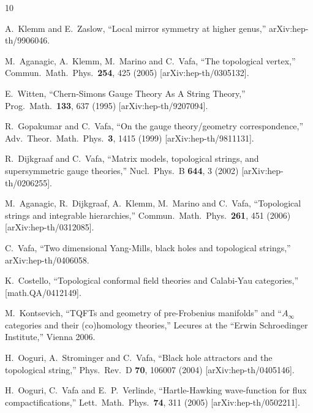 \documentclass[12pt]{article}
\begin{document}
\begin{thebibliography}{10}

  A.~Klemm and E.~Zaslow,
   ``Local mirror symmetry at higher genus,''
  arXiv:hep-th/9906046.


  M.~Aganagic, A.~Klemm, M.~Marino and C.~Vafa,
   ``The topological vertex,''
  Commun.\ Math.\ Phys.\  {\bf 254}, 425 (2005)
  [arXiv:hep-th/0305132].

  E.~Witten,
   ``Chern-Simons Gauge Theory As A String Theory,''
  Prog.\ Math.\  {\bf 133}, 637 (1995)
  [arXiv:hep-th/9207094].

  R.~Gopakumar and C.~Vafa,
   ``On the gauge theory/geometry correspondence,''
  Adv.\ Theor.\ Math.\ Phys.\  {\bf 3}, 1415 (1999)
  [arXiv:hep-th/9811131].

  R.~Dijkgraaf and C.~Vafa,
   ``Matrix models, topological strings, and supersymmetric gauge theories,''
  Nucl.\ Phys.\ B {\bf 644}, 3 (2002)
  [arXiv:hep-th/0206255].




  M.~Aganagic, R.~Dijkgraaf, A.~Klemm, M.~Marino and C.~Vafa,
   ``Topological strings and integrable hierarchies,''
  Commun.\ Math.\ Phys.\  {\bf 261}, 451 (2006)
  [arXiv:hep-th/0312085].

  C.~Vafa,
   ``Two dimensional Yang-Mills, black holes and topological strings,''
  arXiv:hep-th/0406058.

K.~Costello,
``Topological conformal field theories and Calabi-Yau categories,''
[math.QA/0412149].

M.~Kontsevich, ``TQFTs and geometry of pre-Frobenius manifolds'' and  ``$A_\infty$  categories
and  their (co)homology theories,'' Lecures at the ``Erwin Schroedinger Institute,'' Vienna 2006.

  H.~Ooguri, A.~Strominger and C.~Vafa,
   ``Black hole attractors and the topological string,''
  Phys.\ Rev.\ D {\bf 70}, 106007 (2004)
  [arXiv:hep-th/0405146].

  H.~Ooguri, C.~Vafa and E.~P.~Verlinde,
   ``Hartle-Hawking wave-function for flux compactifications,''
  Lett.\ Math.\ Phys.\  {\bf 74}, 311 (2005)
  [arXiv:hep-th/0502211].



\end{thebibliography}
\end{document}

